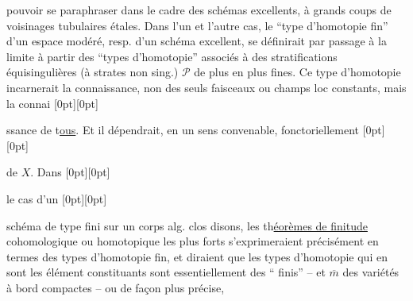 %
pouvoir se paraphraser dans le cadre des schémas excellents, à grands coups de voisinages tubulaires étales.
Dans l'un et l'autre cas, le ``type d'homotopie fin'' d'un espace modéré, resp. d'un schéma excellent, se définirait par passage à la limite à partir des
``types d'homotopie'' associés à des stratifications équisingulières (à strates non sing.) $\mathcal{P}$ de plus en plus fines.
Ce type d'homotopie  incarnerait la connaissance, non des seuls faisceaux ou champs loc constants, mais
 la connai%
\raisebox{0pt}[0pt][0pt]{\parbox{0pt}{}}%
ssance de
t\uline{ous}. Et il dépendrait, en un sens convenable,
fonctoriellement%
\raisebox{0pt}[0pt][0pt]{\parbox{0pt}{}}
de $X$. Dans%
\raisebox{0pt}[0pt][0pt]{\parbox{0pt}{}}
le cas d'un%
\raisebox{0pt}[0pt][0pt]{\parbox{0pt}{}}
schéma de type fini sur un corps alg. clos disons, les
th\uline{éorèmes de finitude} cohomologique ou homotopique les plus forts s'exprimeraient précisément en termes des types d'homotopie fin, et diraient que les types d'homotopie  qui en sont les élément constituants sont essentiellement des `` finis'' -- et $\overline{m}$ des variétés à bord compactes -- ou de façon plus précise,

